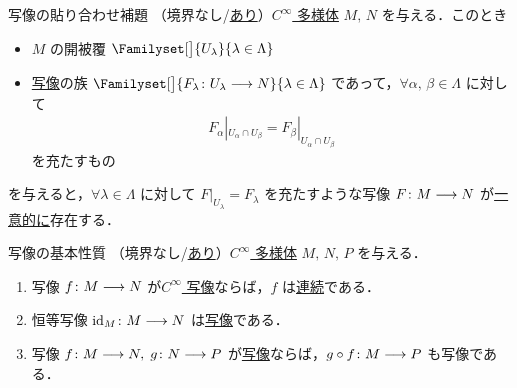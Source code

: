 \documentclass[geometry_main]{subfiles}
\begin{document}
\begin{mycol}[label=col:cinfty_map-gluing]{\cinfty 写像の貼り合わせ補題}
	（境界なし/\hyperref[def:mani-with-boundary]{あり}）\hyperref[diffmani]{$C^\infty$ 多様体} $M,\, N$ を与える．このとき 
	\begin{itemize}
		\item $M$ の開被覆 $\Familyset[\big]{U_\lambda}{\lambda \in \Lambda}$
		\item \hyperref[def.cinfty_mapping]{\cinfty 写像}の族 $\Familyset[\big]{F_\lambda \colon U_\lambda \lto N}{\lambda \in \Lambda}$ であって，$\forall \alpha,\, \beta \in \Lambda$ に対して
		\begin{align}
			F_\alpha|_{U_\alpha \cap U_\beta} = F_\beta|_{U_\alpha \cap U_\beta}
		\end{align}
		を充たすもの
	\end{itemize}
	を与えると，$\forall \lambda \in \Lambda$ に対して $F|_{U_\lambda} = F_\lambda$ を充たすような\cinfty 写像 $F \colon M \longrightarrow N$ が\underline{一意的に}存在する．
\end{mycol}

\begin{myprop}[label=prop:cinfty_map-basic]{\cinfty 写像の基本性質}
	（境界なし/\hyperref[def:mani-with-boundary]{あり}）\hyperref[diffmani]{$C^\infty$ 多様体} $M,\, N,\, P$ を与える．
	\begin{enumerate}
		\item 写像 $f \colon M \longrightarrow N$ が\hyperref[def.cinfty_mapping]{$C^\infty$ 写像}ならば，$f$ は\hyperref[def.continuous]{連続}である．
		\item 恒等写像 $\mathrm{id}_M \colon M \longrightarrow N$ は\hyperref[def.cinfty_mapping]{\cinfty 写像}である．
		\item 写像 $f \colon M \longrightarrow N,\; g \colon N \longrightarrow P$ が\hyperref[def.cinfty_mapping]{\cinfty 写像}ならば，$g \circ f  \colon M\longrightarrow P$ も\cinfty 写像である．
	\end{enumerate}
\end{myprop}
\end{document}

